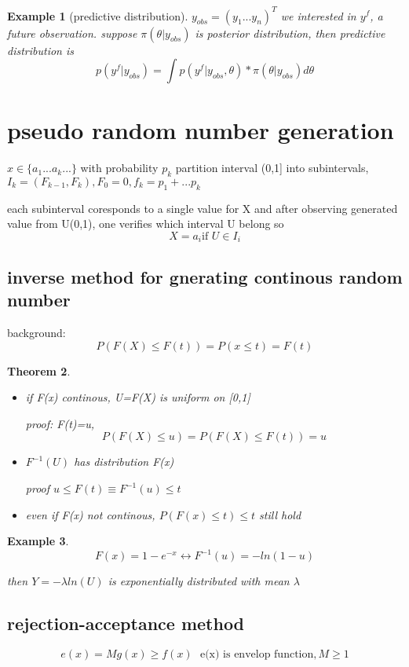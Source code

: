 \documentclass[10pt]{article}
\theoremstyle{break}
\newtheorem{thm}{Theorem}[subsection]
\newtheorem{ex}[thm]{Example}
\begin{document}
 \begin{ex}[predictive distribution]
    $y_{obs}=(y_1...y_n)^T$ we interested in $y^f$, a future observation. 
    suppose $\pi(\theta|y_{obs})$ is posterior distribution, then predictive distribution is 
    $$p(y^f|y_{obs})=\int p(y^f|y_{obs},\theta)*\pi(\theta|y_{obs})d\theta$$
 \end{ex}

 \section{pseudo random number generation}
 $x\in\{a_1...a_k...\}$ with probability $p_k$
 partition interval (0,1] into subintervals,
 $I_k=(F_{k-1}, F_k),F_0=0,f_k=p_1+...p_k$ 
 
 each subinterval coresponds to a single value for X and after 
 observing generated value from U(0,1), one verifies which interval U belong 
 so $$X=a_i \text{if } U\in I_i$$
 \subsection{inverse method for gnerating continous random number}

background:$$P(F(X)\leq F(t))=P(x\leq t)=F(t)$$
\begin{thm}
    \begin{itemize}
        \item 
    if F(x) continous, U=F(X) is uniform on [0,1]

    proof: F(t)=u,$$P(F(X)\leq u)=P(F(X)\leq F(t))=u$$
        \item 
    $F^{-1}(U)$ has distribution F(x)

    proof $ u\leq F(t) \equiv F^{-1}(u) \leq t$
        \item 
    even if F(x) not continous, $P(F(x)\leq t)\leq t$ still hold 
    \end{itemize}
\end{thm}
\begin{ex}
    $$F(x)=1-e^{-x} \leftrightarrow F^{-1}(u)=-ln(1-u)$$

    then $Y=-\lambda ln(U)$ is exponentially distributed with mean $\lambda$
\end{ex}

\subsection{rejection-acceptance method}

$$e(x)=Mg(x)\geq f(x)~~~\text{e(x) is envelop function},M\geq 1$$
\end{document}
